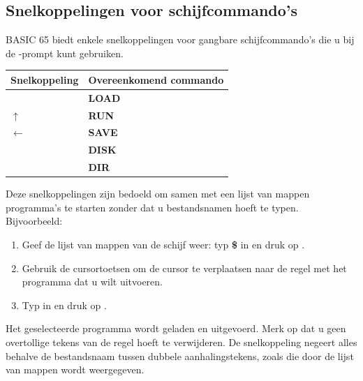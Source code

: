 \subsection{Snelkoppelingen voor schijfcommando's}

BASIC 65 biedt enkele snelkoppelingen voor gangbare schijfcommando's die u bij de -prompt kunt gebruiken.

\begin{center}
\begin{tabular}{|l|l|}
\hline
{\bf Snelkoppeling} & {\bf Overeenkomend commando} \\
\hline
\screentextwide{/} & {\bf LOAD} \\
\hline
$\uparrow$ & {\bf RUN} \\
\hline
$\leftarrow$ & {\bf SAVE} \\
\hline
\screentextwide{@} & {\bf DISK} \\
\hline
\screentextwide{\$} & {\bf DIR} \\
\hline
\end{tabular}
\end{center}

Deze snelkoppelingen zijn bedoeld om samen met een lijst van mappen programma's te starten zonder dat u bestandsnamen hoeft te typen. Bijvoorbeeld:

\begin{enumerate}
\item Geef de lijst van mappen van de schijf weer: typ {\bf \$} in en druk op .\item Gebruik de cursortoetsen om de cursor te verplaatsen naar de regel met het programma dat u wilt uitvoeren.\item Typ {\bf \screentext{$\uparrow$}} in en druk op .
\end{enumerate}

Het geselecteerde programma wordt geladen en uitgevoerd. Merk op dat u geen overtollige tekens van de regel hoeft te verwijderen. De snelkoppeling negeert alles behalve de bestandsnaam tussen dubbele aanhalingstekens, zoals die door de lijst van mappen wordt weergegeven.

